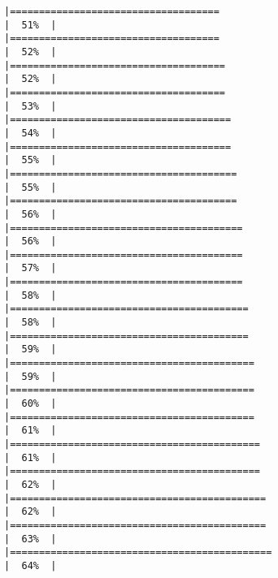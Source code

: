 \documentclass[
]{article}
\begin{document}
\begin{verbatim}
|====================================                                  |  51%  |                                                                              |====================================                                  |  52%  |                                                                              |=====================================                                 |  52%  |                                                                              |=====================================                                 |  53%  |                                                                              |======================================                                |  54%  |                                                                              |======================================                                |  55%  |                                                                              |=======================================                               |  55%  |                                                                              |=======================================                               |  56%  |                                                                              |========================================                              |  56%  |                                                                              |========================================                              |  57%  |                                                                              |========================================                              |  58%  |                                                                              |=========================================                             |  58%  |                                                                              |=========================================                             |  59%  |                                                                              |==========================================                            |  59%  |                                                                              |==========================================                            |  60%  |                                                                              |==========================================                            |  61%  |                                                                              |===========================================                           |  61%  |                                                                              |===========================================                           |  62%  |                                                                              |============================================                          |  62%  |                                                                              |============================================                          |  63%  |                                                                              |=============================================                         |  64%  |                                                                              
\end{verbatim}
\end{document}
